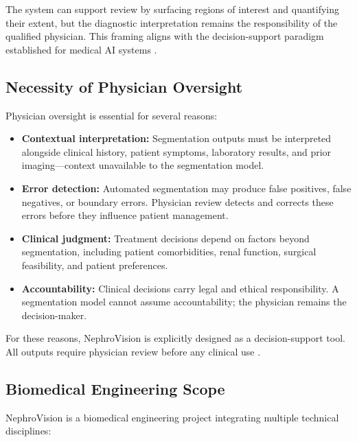 The system can support review by surfacing regions of interest and quantifying their extent, but the diagnostic interpretation remains the responsibility of the qualified physician. This framing aligns with the decision-support paradigm established for medical AI systems \cite{ai_decision_support_framework}.

\subsection{Necessity of Physician Oversight}

Physician oversight is essential for several reasons:

\begin{itemize}
    \item \textbf{Contextual interpretation:} Segmentation outputs must be interpreted alongside clinical history, patient symptoms, laboratory results, and prior imaging---context unavailable to the segmentation model.
    \item \textbf{Error detection:} Automated segmentation may produce false positives, false negatives, or boundary errors. Physician review detects and corrects these errors before they influence patient management.
    \item \textbf{Clinical judgment:} Treatment decisions depend on factors beyond segmentation, including patient comorbidities, renal function, surgical feasibility, and patient preferences.
    \item \textbf{Accountability:} Clinical decisions carry legal and ethical responsibility. A segmentation model cannot assume accountability; the physician remains the decision-maker.
\end{itemize}

For these reasons, NephroVision is explicitly designed as a decision-support tool. All outputs require physician review before any clinical use \cite{iec62304, clinical_ai_oversight}.

\subsection{Biomedical Engineering Scope}

NephroVision is a biomedical engineering project integrating multiple technical disciplines:

